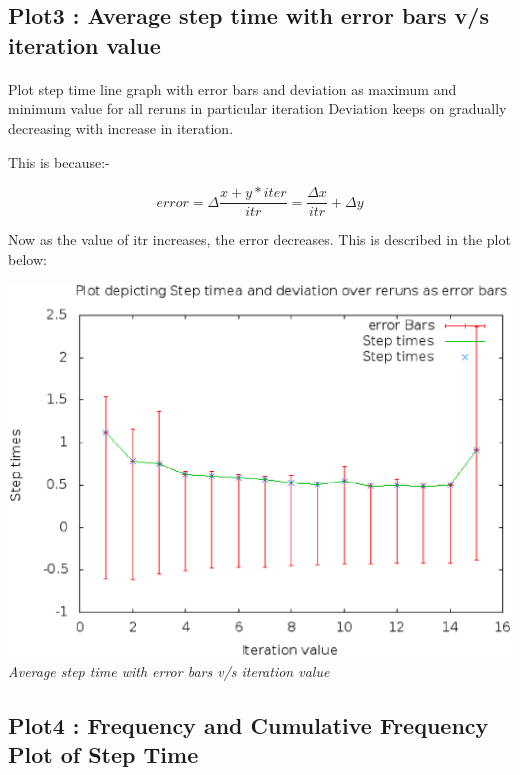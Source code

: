 \documentclass[11pt]{article}
\begin{document}
\subsection{Plot3 : Average step time with error bars v/s iteration value}
\paragraph{}
Plot step time line graph with error bars and deviation as maximum and minimum value for all reruns in particular iteration
Deviation keeps on gradually decreasing with increase in iteration.

This is because:-

\begin{equation}
	error = \Delta \frac {x + y*iter}{itr} = \frac {\Delta{x}}{itr} + \Delta{y}
\end{equation}

Now as the value of itr increases, the error decreases. This is described in the plot below:
\begin{center}
 \includegraphics[scale = 0.4]{images/plot3} \\
  \emph{Average step time with error bars v/s iteration value} \\
\end{center}


\subsection{Plot4 : Frequency and Cumulative Frequency Plot of Step Time}
\end{document}
